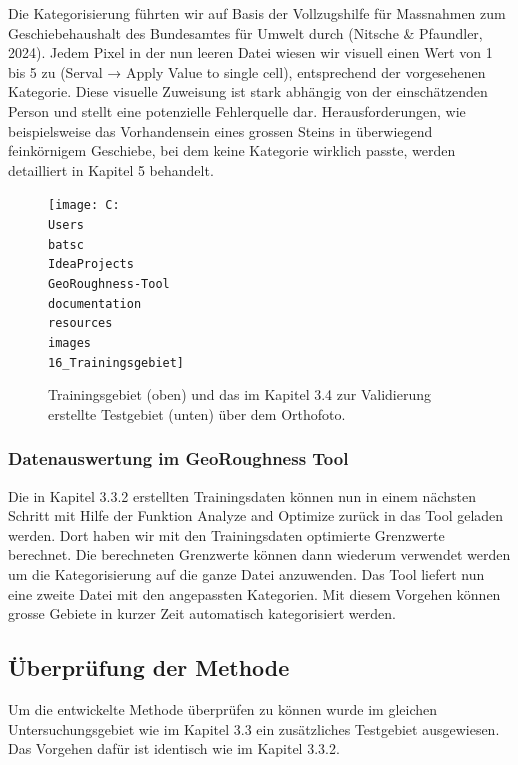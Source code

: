 \documentclass[12pt]{article}
\begin{document}
            Die Kategorisierung führten wir auf Basis der Vollzugshilfe für Massnahmen zum Geschiebehaushalt des Bundesamtes für Umwelt durch (Nitsche & Pfaundler, 2024). %
            Jedem Pixel in der nun leeren Datei wiesen wir visuell einen Wert von 1 bis 5 zu (Serval → Apply Value to single cell), entsprechend der vorgesehenen Kategorie.
            Diese visuelle Zuweisung ist stark abhängig von der einschätzenden Person und stellt eine potenzielle Fehlerquelle dar.
            Herausforderungen, wie beispielsweise das Vorhandensein eines grossen Steins in überwiegend feinkörnigem Geschiebe, bei dem keine Kategorie wirklich passte, werden detailliert in Kapitel 5 behandelt. %

            \begin{figure}
                \centering
                \texttt{[image: C:\\Users\\batsc\\IdeaProjects\\GeoRoughness-Tool\\documentation\\resources\\images\\16\_Trainingsgebiet]}
                \caption{Trainingsgebiet (oben) und das im Kapitel 3.4 zur Validierung erstellte Testgebiet (unten) über dem Orthofoto.}
                \label{fig:16_trainingsgebiet}
            \end{figure}

        \subsubsection{Datenauswertung im GeoRoughness Tool}\label{subsubsec:datenauswertung-im-georoughness-tool}

            Die in Kapitel 3.3.2 erstellten Trainingsdaten können nun in einem nächsten Schritt mit Hilfe der Funktion Analyze and Optimize zurück in das Tool geladen werden. %
            Dort haben wir mit den Trainingsdaten optimierte Grenzwerte berechnet. 
            Die berechneten Grenzwerte können dann wiederum verwendet werden um die Kategorisierung auf die ganze Datei anzuwenden. 
            Das Tool liefert nun eine zweite Datei mit den angepassten Kategorien. 
            Mit diesem Vorgehen können grosse Gebiete in kurzer Zeit automatisch kategorisiert werden.

    \subsection{Überprüfung der Methode}\label{subsec:ueberpruefung-der-methode}
        Um die entwickelte Methode überprüfen zu können wurde im gleichen Untersuchungsgebiet wie im Kapitel 3.3 ein zusätzliches Testgebiet ausgewiesen. %
        Das Vorgehen dafür ist identisch wie im Kapitel 3.3.2. %
\end{document}
